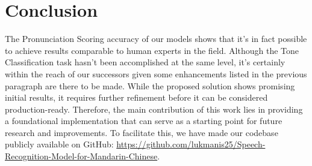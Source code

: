 \documentclass[conference]{IEEEtran}
\begin{document}
\section{Conclusion}
The Pronunciation Scoring accuracy of our models shows that it's in fact possible to achieve results comparable to human experts in the field. Although the Tone Classification task hasn't been accomplished at the same level, it's certainly within the reach of our successors given some enhancements listed in the previous paragraph are there to be made.
While the proposed solution shows promising initial results, it requires further refinement before it can be considered production-ready. Therefore, the main contribution of this work lies in providing a foundational implementation that can serve as a starting point for future research and improvements. To facilitate this, we have made our codebase publicly available on GitHub: \href{https://github.com/lukmanis25/Speech-Recognition-Model-for-Mandarin-Chinese}{https://github.com/lukmanis25/Speech-Recognition-Model-for-Mandarin-Chinese}.
\end{document}
